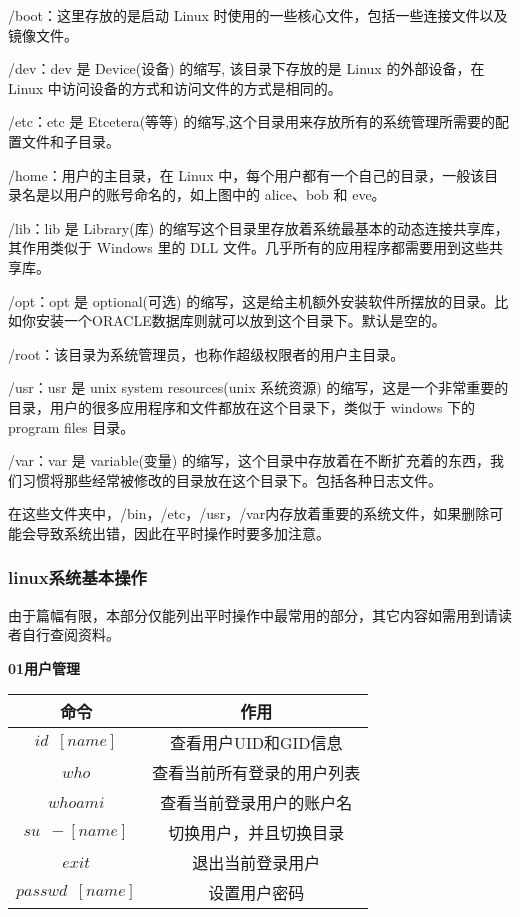 /boot：这里存放的是启动 Linux 时使用的一些核心文件，包括一些连接文件以及镜像文件。

/dev：dev 是 Device(设备) 的缩写, 该目录下存放的是 Linux 的外部设备，在 Linux 中访问设备的方式和访问文件的方式是相同的。

/etc：etc 是 Etcetera(等等) 的缩写,这个目录用来存放所有的系统管理所需要的配置文件和子目录。

/home：用户的主目录，在 Linux 中，每个用户都有一个自己的目录，一般该目录名是以用户的账号命名的，如上图中的 alice、bob 和 eve。

/lib：lib 是 Library(库) 的缩写这个目录里存放着系统最基本的动态连接共享库，其作用类似于 Windows 里的 DLL 文件。几乎所有的应用程序都需要用到这些共享库。

/opt：opt 是 optional(可选) 的缩写，这是给主机额外安装软件所摆放的目录。比如你安装一个ORACLE数据库则就可以放到这个目录下。默认是空的。

/root：该目录为系统管理员，也称作超级权限者的用户主目录。

/usr：usr 是 unix system resources(unix 系统资源) 的缩写，这是一个非常重要的目录，用户的很多应用程序和文件都放在这个目录下，类似于 windows 下的 program files 目录。

/var：var 是 variable(变量) 的缩写，这个目录中存放着在不断扩充着的东西，我们习惯将那些经常被修改的目录放在这个目录下。包括各种日志文件。

在这些文件夹中，/bin，/etc，/usr，/var内存放着重要的系统文件，如果删除可能会导致系统出错，因此在平时操作时要多加注意。

\subsubsection{linux系统基本操作}
由于篇幅有限，本部分仅能列出平时操作中最常用的部分，其它内容如需用到请读者自行查阅资料。

\textbf{01用户管理}
\begin{table}[!htbp]
	\centering
	\begin{tabular}{cc}
		\toprule[1.5pt]
		命令 & 作用\\
		\midrule[1pt]
		$id \enspace [name]$			&查看用户UID和GID信息\\
		$who$			&查看当前所有登录的用户列表\\
		$whoami$			&查看当前登录用户的账户名\\
		$su \enspace -[name]$			&切换用户，并且切换目录\\
		$exit$			&退出当前登录用户\\
		$passwd\enspace [name]$			&设置用户密码\\
		\bottomrule[1.5pt]
	\end{tabular}
\end{table}

